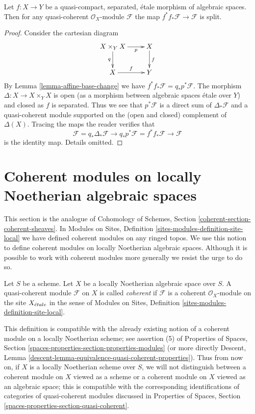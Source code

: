 \begin{lemma}
\label{lemma-etale-pull-push-split}
Let $f : X \to Y$ be a quasi-compact, separated, \'etale morphism
of algebraic spaces. Then for any quasi-coherent $\mathcal{O}_X$-module
$\mathcal{F}$ the map $f^*f_*\mathcal{F} \to \mathcal{F}$ is split.
\end{lemma}

\begin{proof}
Consider the cartesian diagram
$$
\xymatrix{
X \times_Y X \ar[r]_-p \ar[d]_q & X \ar[d]^f \\
X \ar[r]^f & Y
}
$$
By Lemma \ref{lemma-affine-base-change} we have
$f^*f_*\mathcal{F} = q_*p^*\mathcal{F}$. The morphism
$\Delta : X \to X \times_Y X$ is open (as a morphism between
algebraic spaces \'etale over $Y$) and closed as $f$ is separated.
Thus we see that $p^*\mathcal{F}$ is a direct sum of
$\Delta_*\mathcal{F}$ and a quasi-coherent module supported
on the (open and closed) complement of $\Delta(X)$.
Tracing the maps the reader verifies that
$$
\mathcal{F} = q_*\Delta_*\mathcal{F} \to
q_*p^*\mathcal{F} = f^*f_*\mathcal{F} \to
\mathcal{F}
$$
is the identity map. Details omitted.
\end{proof}



\section{Coherent modules on locally Noetherian algebraic spaces}
\label{section-coherent}

\noindent
This section is the analogue of
Cohomology of Schemes, Section \ref{coherent-section-coherent-sheaves}.
In Modules on Sites, Definition \ref{sites-modules-definition-site-local}
we have defined coherent modules on any ringed topos. We use this notion
to define coherent modules on locally Noetherian algebraic spaces.
Although it is possible to work with coherent modules more generally
we resist the urge to do so.

\begin{definition}
\label{definition-coherent}
Let $S$ be a scheme. Let $X$ be a locally Noetherian algebraic space over $S$.
A quasi-coherent module $\mathcal{F}$ on $X$ is called {\it coherent}
if $\mathcal{F}$ is a coherent $\mathcal{O}_X$-module on the site
$X_{\acute{e}tale}$ in the sense of
Modules on Sites, Definition \ref{sites-modules-definition-site-local}.
\end{definition}

\noindent
This definition is compatible with the already existing notion of a
coherent module on a locally Noetherian scheme; see assertion (5) of
Properties of Spaces, Section
\ref{spaces-properties-section-properties-modules} (or more directly
Descent, Lemma \ref{descent-lemma-equivalence-quasi-coherent-properties}).
Thus from now on, if $X$ is a locally Noetherian scheme over $S$,
we will not distinguish between a coherent module on $X$ viewed
as a scheme or a coherent module on $X$ viewed as an algebraic space;
this is compatible with the corresponding identifications of categories
of quasi-coherent modules discussed in
Properties of Spaces, Section \ref{spaces-properties-section-quasi-coherent}.

